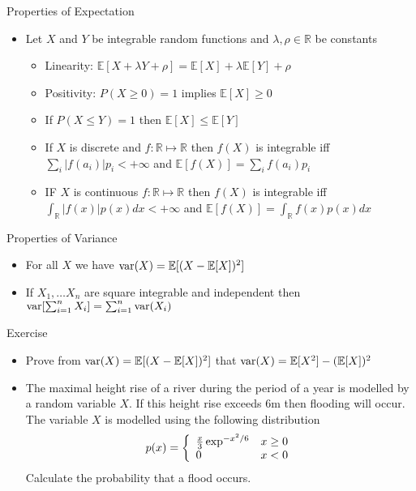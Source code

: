 \documentclass{beamer}
\begin{document}
\begin{frame}{Properties of Expectation} 
\begin{itemize} 
 \item Let $X$ and $Y$ be integrable random functions and $\lambda, \rho \in \mathbb{R}$ be constants
 \begin{itemize}
 \item Linearity: $\mathbb{E}[X + \lambda Y + \rho] = \mathbb{E}[X] +  \lambda \mathbb{E}[Y] + \rho$ 
 \item Positivity: $P(X \geq 0) = 1$ implies $\mathbb{E}[X] \geq 0$ 
 \item If $P(X \leq Y) = 1$ then $\mathbb{E}[X] \leq \mathbb{E}[Y]$
\item If $X$ is discrete and $f: \mathbb{R} \mapsto \mathbb{R}$ then $f(X)$ is integrable iff $\sum_i |f(a_i)| p_i < + \infty$ and $\mathbb{E}[f(X)] =  \sum_i f(a_i) p_i$ 
\item IF $X$ is continuous $f: \mathbb{R} \mapsto \mathbb{R}$ then $f(X)$ is integrable iff $\int_\mathbb{R} |f(x)| p(x) dx < +\infty$ and $\mathbb{E}[f(X)] = \int_\mathbb{R} f(x)p(x) dx $ 
\end{itemize} 
\end{itemize} 
\end{frame}

\begin{frame}{Properties of Variance} 
\begin{itemize} 
 \item For all $X$ we have $\mbox{var}(X) = \mathbb{E}[(X - \mathbb{E}[X])^2]$ 
\item If $X_1, \ldots X_n$ are square integrable and independent then $\mbox{var}[\sum_{i=1}^n X_i] = \sum_{i=1}^n \mbox{var}(X_i)$ 
\end{itemize}
\end{frame}

\begin{frame}{Exercise}  
\begin{itemize}
 \item Prove from  $\mbox{var}(X) = \mathbb{E}[(X - \mathbb{E}[X])^2]$ that $\mbox{var}(X) = \mathbb{E}[X^2] - (\mathbb{E}[X])^2$ 
 \item The maximal height rise of a river during the period of a year is modelled by a random variable $X$. If this height rise exceeds $6$m then flooding will occur. The variable $X$ is modelled using the following distribution 
 \begin{displaymath} 
  p(x) =  \left\{\begin{array}{l l} \frac{x}{3} \exp^{-x^2/6} & x \geq 0 \\ 0 & x < 0 \end{array} \right.  
 \end{displaymath}
 Calculate the probability that a flood occurs. 
\end{itemize}
\end{frame}
\end{document}
